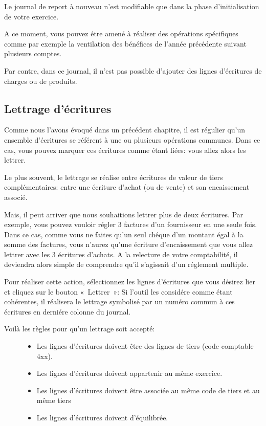 \documentclass[a4paper,10pt,oneside,french]{sphinxmanual}
\begin{document}
Le journal de report à nouveau n’est modifiable que dans la phase d’initialisation de votre exercice.

A ce moment, vous pouvez étre amené à réaliser des opérations spécifiques comme par exemple la ventilation des bénéfices de l’année
précédente suivant plusieurs comptes.

Par contre, dans ce journal, il n’est pas possible d’ajouter des lignes d’écritures de charges ou de produits.


\subsection{Lettrage d’écritures}
\label{\detokenize{accounting/entity:lettrage-d-ecritures}}
Comme nous l’avons évoqué dans un précédent chapitre, il est régulier
qu’un ensemble d’écritures se référent à une ou plusieurs opérations
communes. Dans ce cas, vous pouvez marquer ces écritures comme étant
liées: vous allez alors les lettrer.

Le plus souvent, le lettrage
se réalise entre écritures de valeur de tiers complémentaires: entre
une écriture d’achat (ou de vente) et son encaissement associé.

Mais, il peut arriver que nous souhaitions lettrer plus de deux
écritures. Par exemple, vous pouvez vouloir régler 3 factures d’un
fournisseur en une seule fois. Dans ce cas, comme vous ne faites qu’un
seul chéque d’un montant égal à la somme des factures, vous n’aurez
qu’une écriture d’encaissement que vous allez lettrer avec les 3
écritures d’achats. A la relecture de votre comptabilité, il deviendra
alors simple de comprendre qu’il s’agissait d’un réglement multiple.

Pour réaliser cette action, sélectionnez les lignes d’écritures que vous désirez
lier et cliquez sur le bouton « Lettrer »: Si l’outil les considére comme
étant cohérentes, il réalisera le lettrage symbolisé par un numéro
commun à ces écritures en derniére colonne du journal.
\begin{description}
\item[{Voilà les règles pour qu’un lettrage soit accepté:}] \leavevmode\begin{itemize}
\item {} 
Les lignes d’écritures doivent être des lignes de tiers (code comptable 4xx).

\item {} 
Les lignes d’écritures doivent appartenir au même exercice.

\item {} 
Les lignes d’écritures doivent être associée au même code de tiers et au même tiers

\item {} 
Les lignes d’écritures doivent d’équilibrée.

\end{itemize}

\end{description}
\end{document}
